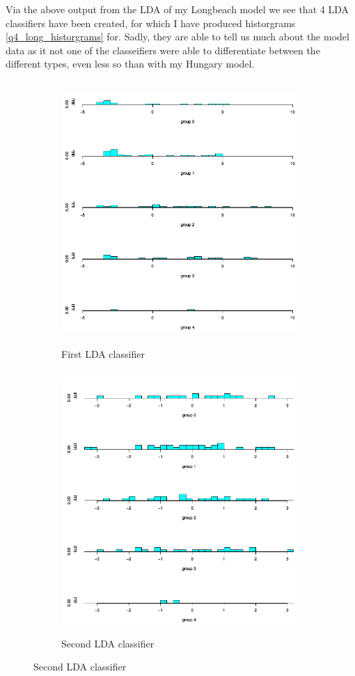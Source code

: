 \documentclass[a4paper]{article}
\begin{document}


Via the above output from the LDA of my Longbeach model we see that 4 LDA
classifiers have been created, for which I have produced historgrams
\ref{q4_long_historgrams} for. Sadly, they are able to tell us much about the
model data as it not one of the classeifiers were able to differentiate between
the different types, even less so than with my Hungary model.

\begin{figure}[H]
	\begin{subfigure}{0.5\textwidth}
		\caption{First LDA classifier}
		\includegraphics[width=0.9\linewidth, height=10cm]{Q4_pics/Long-Hist1.png}
	\end{subfigure}
	\begin{subfigure}{0.5\textwidth}
		\caption{Second LDA classifier}
		\includegraphics[width=0.9\linewidth, height=10cm]{Q4_pics/Long-Hist2.png}
	\end{subfigure}


\end{figure}
\end{document}
